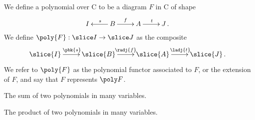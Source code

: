 \begin{def}
  We define a polynomial over C to be a diagram $F$ in C of shape
  \begin{equation}
  \lean{MvPoly}
  \label{equ:poly}
  \xymatrix{
  I  & B \ar[l]_s \ar[r]^f & A \ar[r]^t & J \, . }
  \end{equation}
  We define $\poly{F}:\slice I \to \slice J$ as the composite
  \[
  \xymatrix{
  \slice{I} \ar[r]^{\pbk{s}} & \slice{B} \ar[r]^{\radj{f}} & \slice{A} \ar[r]^{\ladj{t}} & \slice{J} \, . }
  \]
  We refer to $\poly{F}$ as the polynomial functor associated to $F$, or
  the extension of $F$, and say that $F$ represents $\poly F$.
\end{def}

\begin{def}
The sum of two polynomials in many variables.
\end{def}


\begin{def}
The product of two polynomials in many variables.
\end{def}

